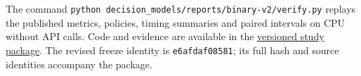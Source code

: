 The command \texttt{python decision\_models/reports/binary-v2/verify.py} replays the published metrics, policies, timing summaries and paired intervals on CPU without API calls. Code and evidence are available in the \href{https://github.com/LuccaPereiraMartins/systematic-trading/tree/codex/research-binary-paper/decision_models/reports/binary-v2}{versioned study package}. The revised freeze identity is \texttt{e6afdaf08581}; its full hash and source identities accompany the package.
